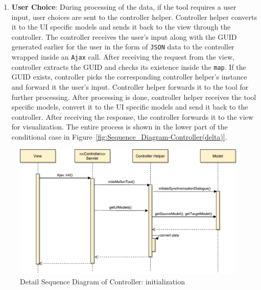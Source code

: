 \begin{enumerate}
	\item {\textbf{User Choice}: During processing of the data, if the tool requires a user input, user choices are sent to the controller helper. Controller helper converts it to the UI specific models and sends it back to the view through the controller. The controller receives the user's input along with the GUID generated earlier for the user in the form of \texttt{JSON} data to the controller wrapped inside an \texttt{Ajax} call. After receiving the request from the view, controller extracts the GUID and checks its existence inside the \texttt{map}. If the GUID exists, controller picks the corresponding controller helper's instance and forward it the user's input. Controller helper forwards it to the tool for further processing. After processing is done, controller helper receives the tool specific models, convert it to the UI specific models and send it back to the controller. After receiving the response, the controller forwards it to the view for visualization. The entire process is shown in the lower part of the conditional case in Figure~\ref{fig:Sequence_Diagram-Controller(delta)}.}
\end{enumerate}

\begin{figure}
	\includegraphics[width=1\textwidth]{figures/Sequence_Diagram-Controller(init)}
	\caption{Detail Sequence Diagram of Controller: initialization}
	\label{fig:Sequence_Diagram-Controller(init)}
\end{figure}

